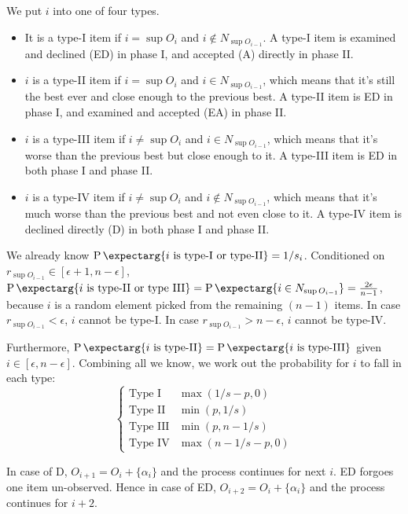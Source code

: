 \documentclass{article}
\newcommand{\prob}{\operatorname{P}\expectarg}
\begin{document}
We put $i$ into one of four types. 
\begin{itemize}
\item It is a type-I item if $i = \sup O_i$ and $i \not \in N_{\sup O_{i-1}}$. A type-I item is examined and declined (ED) in phase I, and accepted (A) directly in phase II.

\item $i$ is a type-II item if $i = \sup O_i$ and $i \in N_{\sup O_{i-1}}$, which means that it's still the best ever and close enough to the previous best. A type-II item is ED in phase I, and examined and accepted (EA) in phase II. 

\item $i$ is a type-III item if $i \neq \sup O_i$ and $i \in N_{\sup O_{i-1}}$, which means that it's worse than the previous best but close enough to it. A type-III item is ED in both phase I and phase II. 

\item $i$ is a type-IV item if $i \neq \sup O_i$ and $i \not \in N_{\sup O_{i-1}}$, which means that it's much worse than the previous best and not even close to it. A type-IV item is declined directly (D) in both phase I and phase II. 
\end{itemize}

We already know $\prob{i \text{ is type-I or type-II}} = 1/s_i$.
Conditioned on $r_{\sup O_{i-1}} \in [\epsilon+1, n-\epsilon]$, $\prob{i \text{ is type-II or type III}}=\prob{i \in N_{\sup O_{i-1}}} = \frac{2\epsilon}{n-1}$, because $i$ is a random element picked from the remaining $(n-1)$ items. 
In case $r_{\sup O_{i-1}} < \epsilon$, $i$ cannot be type-I. In case $r_{\sup O_{i-1}} > n-\epsilon$, $i$ cannot be type-IV.

Furthermore, $\prob{i \text{ is type-II}} = \prob{i \text{ is type-III}}$ given $i \in [\epsilon, n-\epsilon]$. Combining all we know, we work out the probability for $i$ to fall in each type:
\begin{equation}
\begin{cases}

\text{Type I} & \max(1/s - p, 0)\\
\text{Type II} & \min(p, 1/s)\\
\text{Type III} & \min(p, n-1/s)\\
\text{Type IV} & \max(n-1/s-p, 0)

\end{cases}
\end{equation}


In case of D, $O_{i+1} = O_i + \{\alpha_i\}$ and the process continues for next $i$. ED forgoes one item un-observed. Hence in case of ED, $O_{i+2} = O_i + \{\alpha_i\}$ and the process continues for $i+2$.
\end{document}
